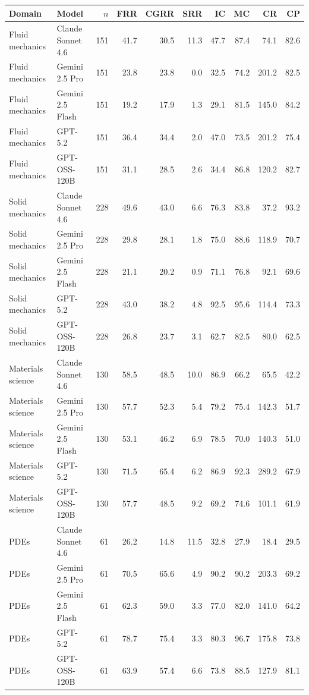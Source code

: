 \begin{tabular}{llrrrrrrrr}
\toprule
Domain & Model & $n$ & FRR & CGRR & SRR & IC & MC & CR & CP \\
\midrule
Fluid mechanics & Claude Sonnet 4.6 & 151 & 41.7 & 30.5 & 11.3 & 47.7 & 87.4 & 74.1 & 82.6 \\
Fluid mechanics & Gemini 2.5 Pro & 151 & 23.8 & 23.8 & 0.0 & 32.5 & 74.2 & 201.2 & 82.5 \\
Fluid mechanics & Gemini 2.5 Flash & 151 & 19.2 & 17.9 & 1.3 & 29.1 & 81.5 & 145.0 & 84.2 \\
Fluid mechanics & GPT-5.2 & 151 & 36.4 & 34.4 & 2.0 & 47.0 & 73.5 & 201.2 & 75.4 \\
Fluid mechanics & GPT-OSS-120B & 151 & 31.1 & 28.5 & 2.6 & 34.4 & 86.8 & 120.2 & 82.7 \\
Solid mechanics & Claude Sonnet 4.6 & 228 & 49.6 & 43.0 & 6.6 & 76.3 & 83.8 & 37.2 & 93.2 \\
Solid mechanics & Gemini 2.5 Pro & 228 & 29.8 & 28.1 & 1.8 & 75.0 & 88.6 & 118.9 & 70.7 \\
Solid mechanics & Gemini 2.5 Flash & 228 & 21.1 & 20.2 & 0.9 & 71.1 & 76.8 & 92.1 & 69.6 \\
Solid mechanics & GPT-5.2 & 228 & 43.0 & 38.2 & 4.8 & 92.5 & 95.6 & 114.4 & 73.3 \\
Solid mechanics & GPT-OSS-120B & 228 & 26.8 & 23.7 & 3.1 & 62.7 & 82.5 & 80.0 & 62.5 \\
Materials science & Claude Sonnet 4.6 & 130 & 58.5 & 48.5 & 10.0 & 86.9 & 66.2 & 65.5 & 42.2 \\
Materials science & Gemini 2.5 Pro & 130 & 57.7 & 52.3 & 5.4 & 79.2 & 75.4 & 142.3 & 51.7 \\
Materials science & Gemini 2.5 Flash & 130 & 53.1 & 46.2 & 6.9 & 78.5 & 70.0 & 140.3 & 51.0 \\
Materials science & GPT-5.2 & 130 & 71.5 & 65.4 & 6.2 & 86.9 & 92.3 & 289.2 & 67.9 \\
Materials science & GPT-OSS-120B & 130 & 57.7 & 48.5 & 9.2 & 69.2 & 74.6 & 101.1 & 61.9 \\
PDEs & Claude Sonnet 4.6 & 61 & 26.2 & 14.8 & 11.5 & 32.8 & 27.9 & 18.4 & 29.5 \\
PDEs & Gemini 2.5 Pro & 61 & 70.5 & 65.6 & 4.9 & 90.2 & 90.2 & 203.3 & 69.2 \\
PDEs & Gemini 2.5 Flash & 61 & 62.3 & 59.0 & 3.3 & 77.0 & 82.0 & 141.0 & 64.2 \\
PDEs & GPT-5.2 & 61 & 78.7 & 75.4 & 3.3 & 80.3 & 96.7 & 175.8 & 73.8 \\
PDEs & GPT-OSS-120B & 61 & 63.9 & 57.4 & 6.6 & 73.8 & 88.5 & 127.9 & 81.1 \\
\bottomrule
\end{tabular}